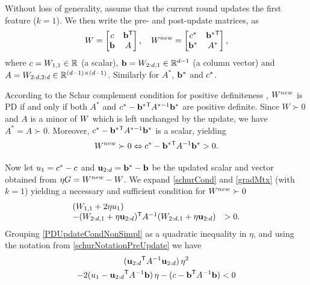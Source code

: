 \documentclass{article}
\begin{document}
Without loss of generality, assume that the current round updates
the first feature ($k = 1$). We then write the pre- and post-update
matrices, as
\begin{equation}
  {W} = \left[ \begin{matrix} c & \mathbf{b}{}^\mathsf{T} \\ \mathbf{b} & A \end{matrix} \right],
  \quad
  {{W^{new}}} = \left[ \begin{matrix} c^* & \mathbf{b}^*{}^\mathsf{T} \\ \mathbf{b}^* & A^* \end{matrix} \right],
  \label{schurNotationPreUpdate}
\end{equation}
 where $c = {W}_{1,1} \in \mathbb{R}$ (a scalar), $\mathbf{b} = {W}_{2:d,1} \in
\mathbb{R}^{d-1}$ (a column vector) and $A = {W}_{2:d,2:d} \in \mathbb{R}^{(d-1)
\times (d-1)}$. Similarly for $A^*$, $\mathbf{b}^*$ and $c^*$.


According to the Schur complement condition for positive definiteness
\citep[p. 650]{boyd2004convex}, ${{W^{new}}}$ is PD if and only if both
$A^*$ and $c^* - \mathbf{b}^*{}^\mathsf{T} A^{*-1} \mathbf{b}^*$ are positive definite.
Since $W \succ 0$ and $A$ is a minor of ${W}$ which is left unchanged by the update, we have $A^* =
A \succ 0$. Moreover, $c^* - \mathbf{b}^*{}^\mathsf{T} A^{*-1} \mathbf{b}^*$ is a
scalar, yielding
\begin{equation}
  {{W^{new}}} \succ  0 \Leftrightarrow  c^* - \mathbf{b}^*{}^\mathsf{T} A^{-1} \mathbf{b}^* >  0.
  \label{schurCond}
\end{equation}
%

%
Now let ${u}_{1} = c^* - c$ and $\mathbf{u}_{2:d} = \mathbf{b}^* - \mathbf{b}$ be the updated scalar and vector
obtained from $\eta G = {{W^{new}}} - {W}$. We expand \eqref{schurCond} and
\eqref{gradMtx} (with $k=1$) yielding a necessary and sufficient condition for ${{W^{new}}} \succ 0$
\begin{equation}
  \begin{array}{ll} 
    ({W}_{1,1} + 2\eta {u}_{1}) \\
    -({W}_{2:d,1} + \eta \mathbf{u}_{2:d}){}^\mathsf{T} A^{-1} ({W}_{2:d,1} + \eta \mathbf{u}_{2:d})  & > 0.
  \end{array}
  \label{PDUpdateCondNonSimpl}
\end{equation}
Grouping \eqref{PDUpdateCondNonSimpl} as a quadratic inequality in $\eta$, and using the notation from \eqref{schurNotationPreUpdate} we have
\begin{multline}
\label{PDUpdateCondQuadForm}
(\mathbf{u}_{2:d}{}^\mathsf{T} A^{-1} \mathbf{u}_{2:d}) \, \eta^2 
\\-2({u}_{1} - \mathbf{u}_{2:d}{}^\mathsf{T} A^{-1} \mathbf{b}) \,\eta 
-(c - \mathbf{b}{}^\mathsf{T}  A^{-1} \mathbf{b}) < 0 
\end{multline}
\end{document}
